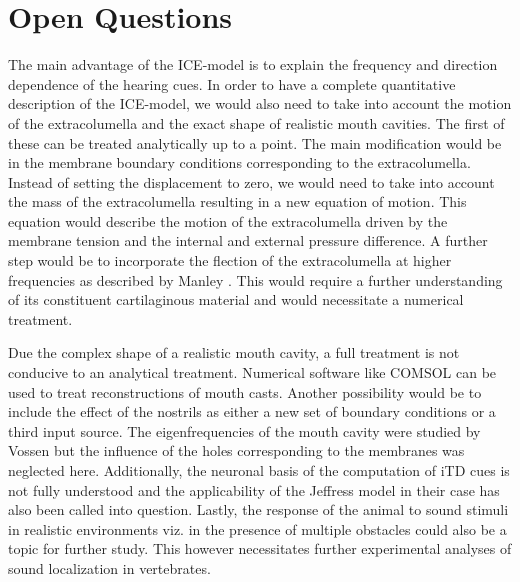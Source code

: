 \section{Open Questions}
The main advantage of the ICE-model is to explain the frequency and direction dependence of the
hearing cues. In order to have a complete quantitative description of the ICE-model, we would also need to take
into account the motion of the extracolumella and the exact shape of realistic mouth cavities. The first of
these can be treated analytically up to a point. The main modification would be in the membrane boundary
conditions corresponding to the extracolumella. Instead of setting the displacement to zero, we would need to take into
account the mass of the extracolumella resulting in a new equation of motion. This equation would describe the motion
of the extracolumella driven by the membrane tension and the internal and external pressure difference. A further step
would be to incorporate the flection of the extracolumella at higher frequencies as described by Manley \cite{manleygecko1}. This would require a further 
understanding of its constituent cartilaginous material and would necessitate a numerical treatment.

Due the complex shape of a realistic mouth cavity, a full treatment is not conducive to an analytical treatment.
Numerical software like COMSOL can be used to treat reconstructions of mouth casts. Another possibility
would be to include the effect of the nostrils as either a new set of boundary conditions or a third input source. The eigenfrequencies
of the mouth cavity were studied by Vossen \cite[p.~39]{vossenthesis} but the influence of the holes corresponding to the membranes was neglected here. Additionally,
the neuronal basis of the computation of iTD cues is not fully understood and the applicability of the Jeffress model in their
case has also been called into question. Lastly, the response of the animal to sound stimuli in realistic environments viz. in the presence
of multiple obstacles could also be a topic for further study. This however necessitates further experimental analyses of sound localization in
vertebrates.